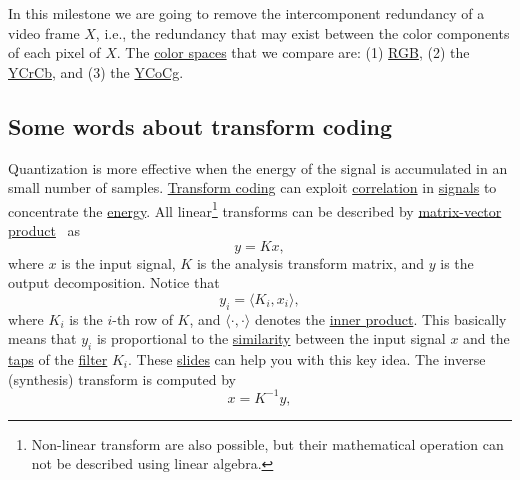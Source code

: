 In this milestone we are going to remove the intercomponent redundancy
of a video frame $X$, i.e., the redundancy that may exist between the
color components of each pixel of $X$. The
\href{https://en.wikipedia.org/wiki/Color_space}{color spaces} that we
compare are: (1)
\href{https://en.wikipedia.org/wiki/RGB_color_model}{RGB}, (2) the
\href{https://en.wikipedia.org/wiki/YCbCr}{YCrCb}, and (3) the
\href{https://en.wikipedia.org/wiki/YCoCg}{YCoCg}.

\subsection{Some words about transform coding}
Quantization is more effective when the energy of the signal is
accumulated in an small number of samples.
\href{https://web.stanford.edu/class/ee398a/handouts/lectures/07-TransformCoding.pdf}{Transform
  coding} can exploit
\href{https://en.wikipedia.org/wiki/Correlation_and_dependence}{correlation}
in \href{https://en.wikipedia.org/wiki/Signal}{signals} to concentrate
the
\href{https://en.wikipedia.org/wiki/Energy_(signal_processing)}{energy}. 
All linear\footnote{Non-linear transform are also possible, but their
  mathematical operation can not be described using linear algebra.}
transforms can be described by
\href{https://en.wikipedia.org/wiki/Matrix_multiplication}{matrix-vector
  product}~\cite{strang4linear} as
\begin{equation}
  y = Kx,
  \label{eq:forward_transform_matrix_form}
\end{equation}
where $x$ is the input signal, $K$ is the analysis transform matrix,
and $y$ is the output decomposition. Notice that
\begin{equation}
  y_i = \langle K_i, x_i\rangle,
\end{equation}
where $K_i$ is the $i$-th row of $K$, and $\langle\cdot,\cdot\rangle$
denotes the
\href{https://mathworld.wolfram.com/InnerProduct.html}{inner
  product}. This basically means that $y_i$ is proportional to the
\href{https://en.wikipedia.org/wiki/Similarity_(geometry)}{similarity}
between the input signal $x$ and the
\href{https://en.wikipedia.org/wiki/Finite_impulse_response}{taps} of
the \href{https://en.wikipedia.org/wiki/Digital_filter}{filter}
$K_i$. These
\href{https://cseweb.ucsd.edu/classes/fa17/cse166-a/lec13.pdf}{slides}
can help you with this key idea. The inverse (synthesis) transform is
computed by
\begin{equation}
  x = K^{-1}y,
  \label{eq:backward_transform_matrix_form}
\end{equation}
